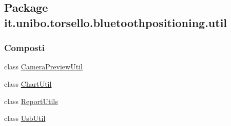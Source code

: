 \hypertarget{namespaceit_1_1unibo_1_1torsello_1_1bluetoothpositioning_1_1util}{}\subsection{Package it.\+unibo.\+torsello.\+bluetoothpositioning.\+util}
\label{namespaceit_1_1unibo_1_1torsello_1_1bluetoothpositioning_1_1util}
\subsubsection*{Composti}
\begin{DoxyCompactItemize}
\item 
class \hyperlink{classit_1_1unibo_1_1torsello_1_1bluetoothpositioning_1_1util_1_1CameraPreviewUtil}{Camera\+Preview\+Util}
\item 
class \hyperlink{classit_1_1unibo_1_1torsello_1_1bluetoothpositioning_1_1util_1_1ChartUtil}{Chart\+Util}
\item 
class \hyperlink{classit_1_1unibo_1_1torsello_1_1bluetoothpositioning_1_1util_1_1ReportUtils}{Report\+Utils}
\item 
class \hyperlink{classit_1_1unibo_1_1torsello_1_1bluetoothpositioning_1_1util_1_1UsbUtil}{Usb\+Util}
\end{DoxyCompactItemize}
